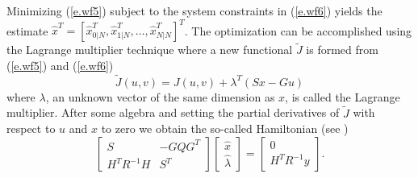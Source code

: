 	Minimizing (\ref{e.wf5}) subject to the system constraints
in (\ref{e.wf6}) yields the estimate 
$\hat{x}^T=[\hat{x}_{0|N}^T,\hat{x}_{1|N}^T,\ldots,\hat{x}_{N|N}^T]^T$.
The optimization can be accomplished using the Lagrange
multiplier technique where a new functional
$\tilde{J}$ is formed from (\ref{e.wf5}) and (\ref{e.wf6})
%
\begin{equation}
\tilde{J}(u,v)=J(u,v)+\lambda^T(Sx-Gu)
\label{e.wf7}
\end{equation}
%
where $\lambda$, an unknown vector of the same dimension as $x$,
is called the Lagrange multiplier.
After some algebra and setting the partial derivatives of $\tilde{J}$
with respect to $u$ and $x$ to zero we obtain the 
so-called Hamiltonian (see \cite{Kailath2})
%
\begin{equation}
\left[\begin{array}{cc}
         S&-GQG^T\\
         H^TR^{-1}H&S^T\end{array}\right]
\left[\begin{array}{c}
         \hat{x}\\
         \hat{\lambda}\end{array}\right]
=
\left[\begin{array}{c}
         0\\
         H^TR^{-1}y\end{array}\right].
\label{e.wf8}
\end{equation}
%

